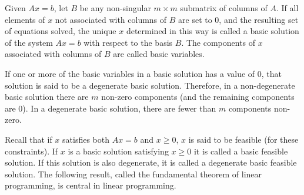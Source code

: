 \begin{original}
Given $Ax = b$, let $B$ be any non-singular $m \times m$ submatrix of columns of $A$. If all elements of $x$ not associated with columns of $B$ are set to 0, and the resulting set of equations solved, the unique $x$ determined in this way is called a basic solution of the system $Ax = b$ with respect to the basis $B$. The components of $x$ associated with columns of $B$ are called basic variables.

If one or more of the basic variables in a basic solution has a value of 0, that solution is said to be a degenerate basic solution. Therefore, in a non-degenerate basic solution there are $m$ non-zero components (and the remaining components are 0). In a degenerate basic solution, there are fewer than $m$ components non-zero.

Recall that if $x$ satisfies both $Ax = b$ and $x \ge 0$, $x$ is said to be feasible (for these constraints). If $x$ is a basic solution satisfying $x \ge 0$ it is called a basic feasible solution. If this solution is also degenerate, it is called a degenerate basic feasible solution. The following result, called the fundamental theorem of linear programming, is central in linear programming.
\end{original}
